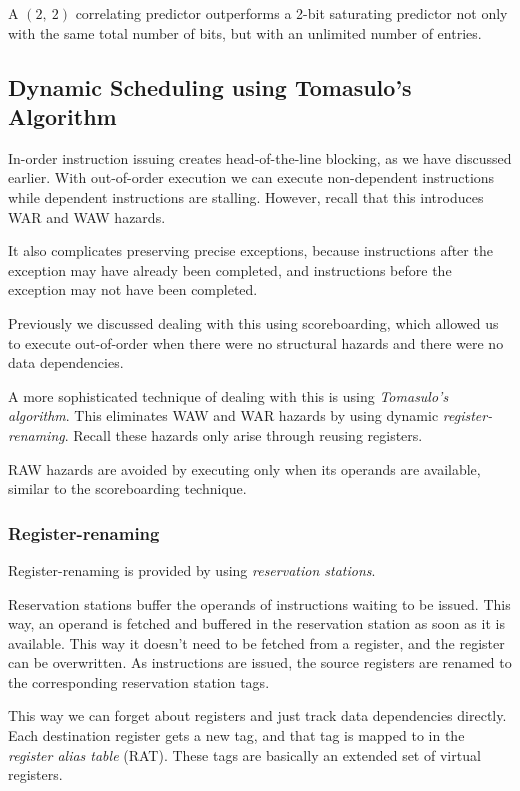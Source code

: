 \documentclass{article}
\begin{document}
A $(2,\ 2)$ correlating predictor outperforms a 2-bit saturating predictor not only with the same total number of bits, but with an unlimited number of entries.


\subsection{Dynamic Scheduling using Tomasulo's Algorithm}

In-order instruction issuing creates head-of-the-line blocking, as we have discussed earlier. With out-of-order execution we can execute non-dependent instructions while dependent instructions are stalling. However, recall that this introduces WAR and WAW hazards. 

It also complicates preserving precise exceptions, because instructions after the exception may have already been completed, and instructions before the exception may not have been completed. 

Previously we discussed dealing with this using scoreboarding, which allowed us to execute out-of-order when there were no structural hazards and there were no data dependencies. 

A more sophisticated technique of dealing with this is using \textit{Tomasulo's algorithm}. This eliminates WAW and WAR hazards by using dynamic \textit{register-renaming}. Recall these hazards only arise through reusing registers. 

RAW hazards are avoided by executing only when its operands are available, similar to the scoreboarding technique. 

\subsubsection{Register-renaming}

Register-renaming is provided by using \textit{reservation stations}. 

Reservation stations buffer the operands of instructions waiting to be issued. This way, an operand is fetched and buffered in the reservation station as soon as it is available. This way it doesn't need to be fetched from a register, and the register can be overwritten. As instructions are issued, the source registers are renamed to the corresponding reservation station tags.

This way we can forget about registers and just track data dependencies directly. Each destination register gets a new tag, and that tag is mapped to in the \textit{register alias table} (RAT). These tags are basically an extended set of virtual registers.
\end{document}
